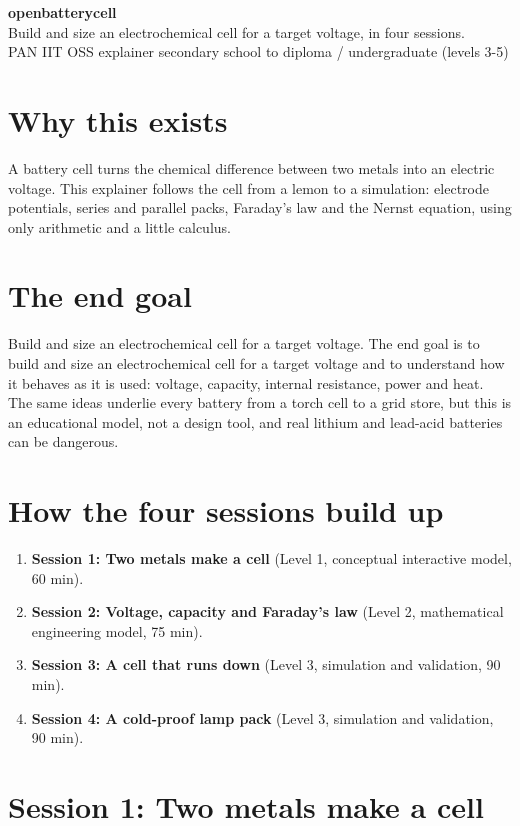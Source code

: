 \documentclass[11pt,a4paper]{article}
\begin{document}
\begin{center}{\LARGE\bfseries openbatterycell}\\[0.4em]{\large Build and size an electrochemical cell for a target voltage, in four sessions.}\\[0.2em]\small PAN IIT OSS explainer \textbullet{} secondary school to diploma / undergraduate (levels 3-5)\end{center}

\section*{Why this exists}
A battery cell turns the chemical difference between two metals into an electric voltage. This explainer follows the cell from a lemon to a simulation: electrode potentials, series and parallel packs, Faraday's law and the Nernst equation, using only arithmetic and a little calculus.

\section*{The end goal}
Build and size an electrochemical cell for a target voltage. The end goal is to build and size an electrochemical cell for a target voltage and to understand how it behaves as it is used: voltage, capacity, internal resistance, power and heat. The same ideas underlie every battery from a torch cell to a grid store, but this is an educational model, not a design tool, and real lithium and lead-acid batteries can be dangerous.

\section*{How the four sessions build up}
\begin{enumerate}[nosep]
\item \textbf{Session 1: Two metals make a cell} (Level 1, conceptual interactive model, 60 min).
\item \textbf{Session 2: Voltage, capacity and Faraday's law} (Level 2, mathematical engineering model, 75 min).
\item \textbf{Session 3: A cell that runs down} (Level 3, simulation and validation, 90 min).
\item \textbf{Session 4: A cold-proof lamp pack} (Level 3, simulation and validation, 90 min).
\end{enumerate}

\section{Session 1: Two metals make a cell}
\end{document}
